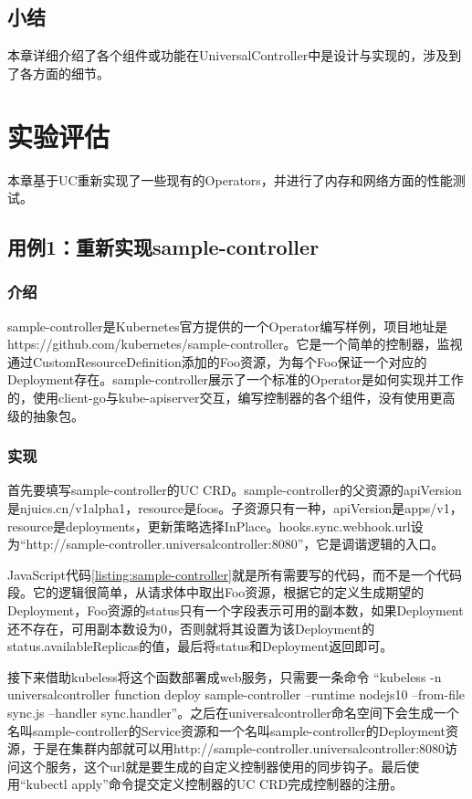 \documentclass[macfonts,master]{njuthesis}
\begin{document}
\section{小结}
本章详细介绍了各个组件或功能在UniversalController中是设计与实现的，涉及到了各方面的细节。

\chapter{实验评估}\label{chapter_experiments}

本章基于UC重新实现了一些现有的Operators，并进行了内存和网络方面的性能测试。

\section{用例1：重新实现sample-controller}\label{section:sample-controller}
\subsection{介绍}
sample-controller是Kubernetes官方提供的一个Operator编写样例，项目地址是https://github.com/kubernetes/sample-controller。它是一个简单的控制器，监视通过CustomResourceDefinition添加的Foo资源，为每个Foo保证一个对应的Deployment存在。sample-controller展示了一个标准的Operator是如何实现并工作的，使用client-go与kube-apiserver交互，编写控制器的各个组件，没有使用更高级的抽象包。

\subsection{实现}

首先要填写sample-controller的UC CRD。sample-controller的父资源的apiVersion是njuics.cn/v1alpha1，resource是foos。子资源只有一种，apiVersion是apps/v1，resource是deployments，更新策略选择InPlace。hooks.sync.webhook.url设为``http://sample-controller.universalcontroller:8080''，它是调谐逻辑的入口。

JavaScript代码\ref{listing:sample-controller}就是所有需要写的代码，而不是一个代码段。它的逻辑很简单，从请求体中取出Foo资源，根据它的定义生成期望的Deployment，Foo资源的status只有一个字段表示可用的副本数，如果Deployment还不存在，可用副本数设为0，否则就将其设置为该Deployment的status.availableReplicas的值，最后将status和Deployment返回即可。

接下来借助kubeless将这个函数部署成web服务，只需要一条命令
``kubeless -n universalcontroller function deploy sample-controller --runtime nodejs10 --from-file sync.js --handler sync.handler''。之后在universalcontroller命名空间下会生成一个名叫sample-controller的Service资源和一个名叫sample-controller的Deployment资源，于是在集群内部就可以用http://sample-controller.universalcontroller:8080访问这个服务，这个url就是要生成的自定义控制器使用的同步钩子。最后使用``kubectl apply''命令提交定义控制器的UC CRD完成控制器的注册。
\end{document}
